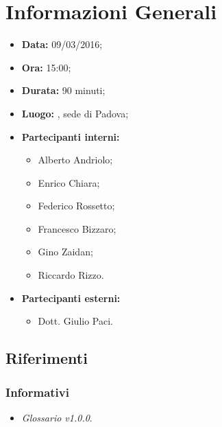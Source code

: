 \section{Informazioni Generali}

\begin{itemize}
\item \textbf{Data:} 09/03/2016;
\item \textbf{Ora:} 15:00;
\item \textbf{Durata:} 90 minuti;
\item \textbf{Luogo:} \AZIENDA, sede di Padova;
\item \textbf{Partecipanti interni:} \GRUPPO
	\begin{itemize}
	\item Alberto Andriolo;
	\item Enrico Chiara;
	\item Federico Rossetto;
	\item Francesco Bizzaro;
	\item Gino Zaidan;
	\item Riccardo Rizzo.
	\end{itemize}
\item \textbf{Partecipanti esterni:} \AZIENDA
	\begin{itemize}
	\item Dott. Giulio Paci.
	\end{itemize}
\end{itemize}

\subsection{Riferimenti}

\subsubsection{Informativi}
\begin{itemize}
	\item \textit{Glossario v1.0.0}.
\end{itemize}

\newpage










